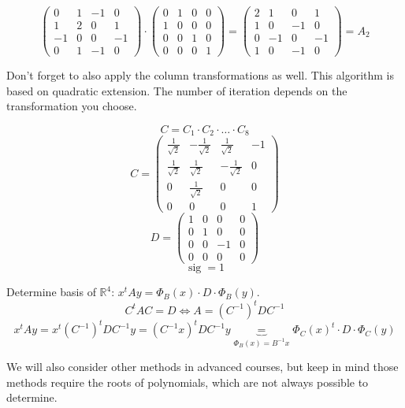 \documentclass[a4paper]{article}
\theoremstyle{definition}
\begin{document}
\[  \begin{pmatrix}
    0 & 1 & -1 & 0 \\
    1 & 2 & 0 & 1 \\
    -1 & 0 & 0 & -1 \\
    0 & 1 & -1 & 0
  \end{pmatrix}
  \cdot
  \begin{pmatrix}
    0 & 1 & 0 & 0 \\
    1 & 0 & 0 & 0 \\
    0 & 0 & 1 & 0 \\
    0 & 0 & 0 & 1
  \end{pmatrix}
  = \begin{pmatrix}
    2 & 1 & 0 & 1 \\
    1 & 0 & -1 & 0 \\
    0 & -1 & 0 & -1 \\
    1 & 0 & -1 & 0
  \end{pmatrix}
  = A_2
\]

Don't forget to also apply the column transformations as well.
This algorithm is based on quadratic extension.
The number of iteration depends on the transformation you choose.

\[ C = C_1 \cdot C_2 \cdot \ldots \cdot C_8 \]
\[
  C = \begin{pmatrix}
    \frac1{\sqrt{2}} & -\frac1{\sqrt{2}} & \frac1{\sqrt{2}} & -1 \\
    \frac1{\sqrt{2}} & \frac1{\sqrt{2}} & -\frac1{\sqrt{2}} & 0 \\
    0 & \frac1{\sqrt{2}} & 0 & 0 \\
    0 & 0 & 0 & 1
  \end{pmatrix}
\] \[
  D = \begin{pmatrix}
    1 & 0 & 0 & 0 \\
    0 & 1 & 0 & 0 \\
    0 & 0 & -1 & 0 \\
    0 & 0 & 0 & 0
  \end{pmatrix}
\]
\[ \operatorname{sig} = 1 \]

Determine basis of $\mathbb R^4$: $x^t A y = \Phi_B(x) \cdot D \cdot \Phi_B(y)$.
\[ C^t A C = D \Leftrightarrow A = (C^{-1})^t D C^{-1} \]
\[ x^t A y = x^t (C^{-1})^t DC^{-1} y = (C^{-1}x)^t D C^{-1} y \underbrace{=}_{\Phi_B(x) = B^{-1}x} \Phi_C(x)^t \cdot D \cdot \Phi_C(y) \]

We will also consider other methods in advanced courses,
but keep in mind those methods require the roots of polynomials, which are not always possible to determine.
\end{document}
